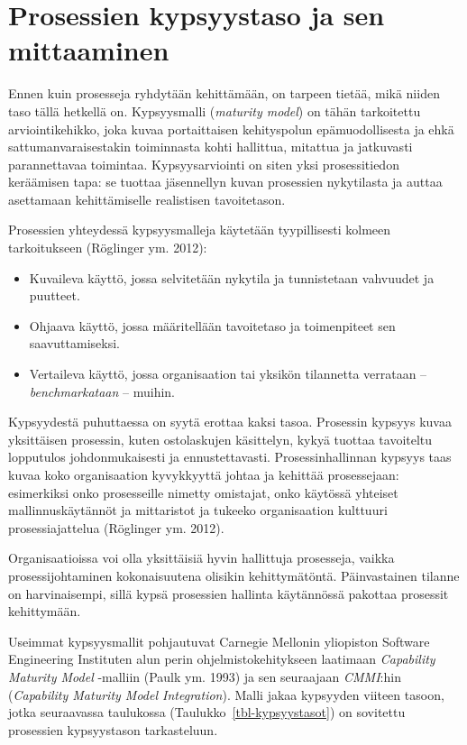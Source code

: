 \documentclass[
  finnish,
  letterpaper,
  DIV=11,
  numbers=noendperiod,
  oneside]{scrreprt}
\providecommand{\tightlist}{%
  \setlength{\itemsep}{0pt}\setlength{\parskip}{0pt}}
\begin{document}
\section{Prosessien kypsyystaso ja sen
mittaaminen}\label{prosessien-kypsyystaso-ja-sen-mittaaminen}

Ennen kuin prosesseja ryhdytään kehittämään, on tarpeen tietää, mikä
niiden taso tällä hetkellä on. Kypsyysmalli (\emph{maturity model}) on
tähän tarkoitettu arviointikehikko, joka kuvaa portaittaisen
kehityspolun epämuodollisesta ja ehkä sattumanvaraisestakin toiminnasta
kohti hallittua, mitattua ja jatkuvasti parannettavaa toimintaa.
Kypsyysarviointi on siten yksi prosessitiedon keräämisen tapa: se
tuottaa jäsennellyn kuvan prosessien nykytilasta ja auttaa asettamaan
kehittämiselle realistisen tavoitetason.

Prosessien yhteydessä kypsyysmalleja käytetään tyypillisesti kolmeen
tarkoitukseen (Röglinger ym. 2012):

\begin{itemize}
\tightlist
\item
  Kuvaileva käyttö, jossa selvitetään nykytila ja tunnistetaan vahvuudet
  ja puutteet.
\item
  Ohjaava käyttö, jossa määritellään tavoitetaso ja toimenpiteet sen
  saavuttamiseksi.
\item
  Vertaileva käyttö, jossa organisaation tai yksikön tilannetta
  verrataan -- \emph{benchmarkataan} -- muihin.
\end{itemize}

Kypsyydestä puhuttaessa on syytä erottaa kaksi tasoa. Prosessin kypsyys
kuvaa yksittäisen prosessin, kuten ostolaskujen käsittelyn, kykyä
tuottaa tavoiteltu lopputulos johdonmukaisesti ja ennustettavasti.
Prosessinhallinnan kypsyys taas kuvaa koko organisaation kyvykkyyttä
johtaa ja kehittää prosessejaan: esimerkiksi onko prosesseille nimetty
omistajat, onko käytössä yhteiset mallinnuskäytännöt ja mittaristot ja
tukeeko organisaation kulttuuri prosessiajattelua (Röglinger ym. 2012).

Organisaatioissa voi olla yksittäisiä hyvin hallittuja prosesseja,
vaikka prosessijohtaminen kokonaisuutena olisikin kehittymätöntä.
Päinvastainen tilanne on harvinaisempi, sillä kypsä prosessien hallinta
käytännössä pakottaa prosessit kehittymään.

Useimmat kypsyysmallit pohjautuvat Carnegie Mellonin yliopiston Software
Engineering Instituten alun perin ohjelmistokehitykseen laatimaan
\emph{Capability Maturity Model} -malliin (Paulk ym. 1993) ja sen
seuraajaan \emph{CMMI}:hin (\emph{Capability Maturity Model
Integration}). Malli jakaa kypsyyden viiteen tasoon, jotka seuraavassa
taulukossa (Taulukko~\ref{tbl-kypsyystasot}) on sovitettu prosessien
kypsyystason tarkasteluun.
\end{document}
